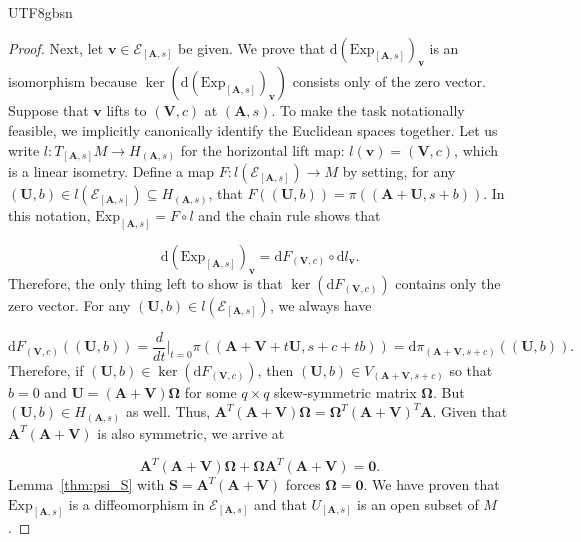 \documentclass[12pt]{report}
\newcommand{\bracket}[1]{\left ( #1 \right )}
\theoremstyle{plain}
\theoremstyle{definition}
\begin{document}
\begin{CJK*}{UTF8}{gbsn}
\begin{proof}
Next, let $\bm{v} \in \mathcal{E}_{[\bm{A},s]}$
be given. We prove that $\mathrm{d} \bracket{\text{Exp}_{[\bm{A},s]}}_{\bm{v}}$
is an isomorphism because $\ker \bracket{\mathrm{d} \bracket{\text{Exp}_{[\bm{A},s]}}_{\bm{v}}}$
consists only of the zero vector.
Suppose that $\bm{v}$ lifts to $(\bm{V},c)$ at $(\bm{A},s)$.
To make the task notationally feasible, we 
implicitly canonically identify the Euclidean spaces together.
Let us write $l: T_{[\bm{A},s]}M \to H_{(\bm{A},s)}$ 
for the horizontal lift map: $l(\bm{v}) = (\bm{V},c)$,
which is a linear isometry.
Define a map $F: l(\mathcal{E}_{[\bm{A},s]}) \to M$
by setting, for 
any $(\bm{U},b) \in l(\mathcal{E}_{[\bm{A},s]}) \subseteq H_{(\bm{A},s)}$,
that $F((\bm{U},b)) = \pi((\bm{A}+\bm{U}, s + b))$.
In this notation, $\text{Exp}_{[\bm{A},s]} = F \circ l$
and the chain rule shows that 

\begin{equation*}
  \mathrm{d} \bracket{\text{Exp}_{[\bm{A},s]}}_{\bm{v}} = 
  \mathrm{d} F_{(\bm{V},c)} \circ \mathrm{d} l_{\bm{v}}.
\end{equation*}
Therefore, the only thing left to show is that 
$\ker \bracket{\mathrm{d} F_{(\bm{V},c)}}$ contains only the zero vector.
For any $(\bm{U},b) \in l(\mathcal{E}_{[\bm{A},s]})$,
we always have 

\begin{equation*}
  \mathrm{d} F_{(\bm{V},c)} ((\bm{U},b))
  = \frac{d}{dt}\bigg|_{t=0} \pi((\bm{A}+\bm{V}+t\bm{U}, s+c+tb))
  = \mathrm{d} \pi_{(\bm{A}+\bm{V}, s+c)}((\bm{U},b)).
\end{equation*}
Therefore, if $(\bm{U},b) \in \ker \bracket{\mathrm{d} F_{(\bm{V},c)}}$,
then $(\bm{U},b) \in V_{(\bm{A}+\bm{V}, s+c)}$
so that $b = 0$ and $\bm{U} = (\bm{A}+\bm{V})\bm{\Omega}$
for some $q \times q$ skew-symmetric matrix $\bm{\Omega}$.
But $(\bm{U},b) \in H_{(\bm{A}, s)}$ as well.
Thus, $\bm{A}^T(\bm{A}+\bm{V})\bm{\Omega} = \bm{\Omega}^T (\bm{A}+\bm{V})^T \bm{A}$.
Given that $\bm{A}^T(\bm{A}+\bm{V})$ is also symmetric,
we arrive at 

\begin{equation*}
  \bm{A}^T(\bm{A}+\bm{V})\bm{\Omega} + \bm{\Omega} \bm{A}^T(\bm{A}+\bm{V}) =\bm{0}.
\end{equation*}
Lemma~\ref{thm:psi_S} with $\bm{S} = \bm{A}^T(\bm{A}+\bm{V})$
forces $\bm{\Omega} = \bm{0}$.
We have proven that $\text{Exp}_{[\bm{A},s]}$
is a diffeomorphism in $\mathcal{E}_{[\bm{A},s]}$
and that $U_{[\bm{A},s]}$ is an open subset of $M$.


\end{proof}
\end{CJK*}
\end{document}
